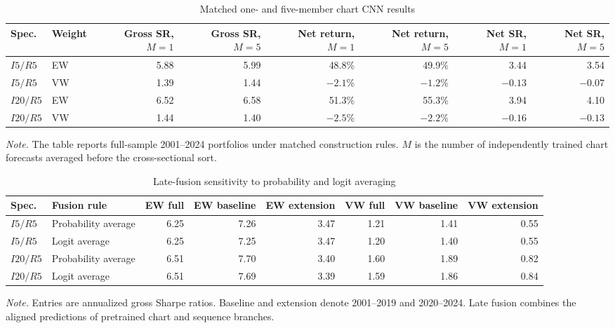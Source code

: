 \begin{table}[htbp]
\centering
\caption{Matched one- and five-member chart CNN results}
\label{tab:app_ensemble_comparison}
\scriptsize
\setlength{\tabcolsep}{4.3pt}
\begin{tabular}{@{}llrrrrrr@{}}
\toprule
Spec. & Weight & Gross SR, $M=1$ & Gross SR, $M=5$ & Net return, $M=1$ & Net return, $M=5$ & Net SR, $M=1$ & Net SR, $M=5$ \\
\midrule
$I5/R5$  & EW & 5.88 & 5.99 & 48.8\% & 49.9\% & 3.44 & 3.54 \\
$I5/R5$  & VW & 1.39 & 1.44 & $-2.1$\% & $-1.2$\% & $-0.13$ & $-0.07$ \\
$I20/R5$ & EW & 6.52 & 6.58 & 51.3\% & 55.3\% & 3.94 & 4.10 \\
$I20/R5$ & VW & 1.44 & 1.40 & $-2.5$\% & $-2.2$\% & $-0.16$ & $-0.13$ \\
\bottomrule
\end{tabular}
\begin{minipage}{\textwidth}
\footnotesize\textit{Note.} The table reports full-sample 2001--2024 portfolios under matched construction rules. $M$ is the number of independently trained chart forecasts averaged before the cross-sectional sort.
\end{minipage}
\end{table}

\begin{table}[htbp]
\centering
\caption{Late-fusion sensitivity to probability and logit averaging}
\label{tab:app_late_fusion}
\scriptsize
\setlength{\tabcolsep}{4.2pt}
\begin{tabular}{@{}llrrrrrr@{}}
\toprule
Spec. & Fusion rule & EW full & EW baseline & EW extension & VW full & VW baseline & VW extension \\
\midrule
$I5/R5$  & Probability average & 6.25 & 7.26 & 3.47 & 1.21 & 1.41 & 0.55 \\
$I5/R5$  & Logit average       & 6.25 & 7.25 & 3.47 & 1.20 & 1.40 & 0.55 \\
$I20/R5$ & Probability average & 6.51 & 7.70 & 3.40 & 1.60 & 1.89 & 0.82 \\
$I20/R5$ & Logit average       & 6.51 & 7.69 & 3.39 & 1.59 & 1.86 & 0.84 \\
\bottomrule
\end{tabular}
\begin{minipage}{\textwidth}
\footnotesize\textit{Note.} Entries are annualized gross Sharpe ratios. Baseline and extension denote 2001--2019 and 2020--2024. Late fusion combines the aligned predictions of pretrained chart and sequence branches.
\end{minipage}
\end{table}

